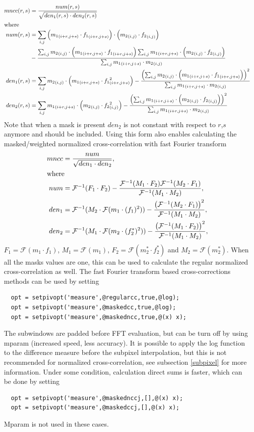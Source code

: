 \documentclass[10pt]{article}
\newcommand{\FT}{\ensuremath{\mathcal F}}
\newcommand{\iFT}{\ensuremath{\mathcal F^{-1}}}
\begin{document}
\begin{align*}
  mncc(r,s) &= \frac{num(r,s)}{\sqrt{den_1(r,s)\cdot den_2(r,s)}} \\
\intertext{where}
	 num(r,s) &= \sum_{i,j} \left({m_1}_{(i+r,j+s)}\cdot {f_1}_{(i+r,j+s)}\right)\cdot\left( {m_2}_{(i,j)}\cdot {f_2}_{(i,j)}\right) \\
	 &-\frac{\sum_{i,j} {m_2}_{(i,j)}\cdot\left({m_1}_{(i+r,j+s)}\cdot {f_1}_{(i+r,j+s)}\right)\sum_{i,j} {m_1}_{(i+r,j+s)}\cdot \left({m_2}_{(i,j)}\cdot {f_2}_{(i,j)}\right)}
	 {\sum_{i,j} {m_1}_{(i+r,j+s)}\cdot {m_2}_{(i,j)}} \\
	 den_1(r,s) &= \sum_{i,j} {m_2}_{(i,j)}\cdot\left({m_1}_{(i+r,j+s)}\cdot {f_1}_{(i+r,j+s)}^2\right)  
	 -\frac{\left(\sum_{i,j} {m_2}_{(i,j)}\cdot\left({m_1}_{(i+r,j+s)}\cdot {f_1}_{(i+r,j+s)}\right)\right)^2}{\sum_{i,j} {m_1}_{(i+r,j+s)}\cdot {m_2}_{(i,j)}} \\
	 den_2(r,s) &= \sum_{i,j} {m_1}_{(i+r,j+s)}\cdot\left({m_2}_{(i,j)}\cdot {f_2}_{(i,j)}^2\right)
	 -\frac{\left(\sum_{i,j} {m_1}_{(i+r,j+s)}\cdot\left({m_2}_{(i,j)}\cdot {f_2}_{(i,j)}\right)\right)^2}{\sum_{i,j} {m_1}_{(i+r,j+s)}\cdot {m_2}_{(i,j)}} 
\end{align*}
Note that when a mask is present $den_2$ is not constant with respect to $r$,$s$ anymore and should be included.
Using this form also enables calculating the masked/weighted normalized cross-correlation with fast Fourier transform \citep{Padfield2012}
\begin{align*}
  mncc &= \frac{num}{\sqrt{den_1\cdot den_2}}, \\
\intertext{where}
	 num &= \iFT(F_1\cdot F_2) - \frac{\iFT(M_1\cdot F_2)\iFT(M_2\cdot F_1)}{\iFT(M_1\cdot M_2)}, \\
	 den_1 &= \iFT(M_2\cdot\FT(m_1\cdot (f_1)^2))   - \frac{\left(\iFT(M_2\cdot F_1)\right)^2}{\iFT(M_1\cdot M_2)}, \\
	 den_2 &= \iFT(M_1\cdot\FT(m_2\cdot (f_2^*)^2)) - \frac{\left(\iFT(M_1\cdot F_2)\right)^2}{\iFT(M_1\cdot M_2)},
  \end{align*}
$F_1=\FT(m_1\cdot f_1)$, $M_1=\FT(m_1)$, $F_2=\FT(m_2^*\cdot f_2^*)$ and $M_2=\FT(m_2^*)$.
When all the masks values are one, this can be used to calculate the regular normalized cross-correlation as well.
%
The fast Fourier transform based cross-corrections methods can be used by setting
\begin{lstlisting}
  opt = setpivopt('measure',@regularcc,true,@log);   
  opt = setpivopt('measure',@maskedcc,true,@log);   
  opt = setpivopt('measure',@maskedncc,true,@(x) x);  
\end{lstlisting}
The subwindows are padded before FFT evaluation, but can be turn off by using mparam (increased speed, less accuracy).
It is possible to apply the log function to the difference measure before the subpixel 
interpolation, but this is not recommended for normalized cross-correlation,
see subsection \ref{subpixel} for more information.
Under some condition, calculation direct sums is faster, which can be done by setting
\begin{lstlisting}
  opt = setpivopt('measure',@maskednccj,[],@(x) x);
  opt = setpivopt('measure',@maskedccj,[],@(x) x);
\end{lstlisting}
Mparam is not used in these cases.
  
\end{document}
